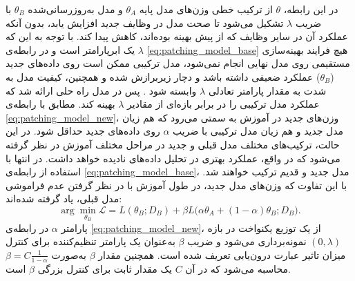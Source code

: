 در این رابطه، $\theta$ از ترکیب خطی وزن‌های مدل پایه $\theta_A$ و مدل به‌روزرسانی‌شده $\theta_B$ با ضریب $\lambda$ تشکیل می‌شود تا صحت مدل در وظایف جدید افزایش یابد، بدون آنکه عملکرد آن در سایر وظایف که از پیش بهینه بوده‌اند، کاهش پیدا کند. با توجه به این که $\lambda$ یک ابرپارامتر  است و در رابطه‌ی \eqref{eq:patching_model_base} هیچ فرایند بهینه‌سازی مستقیمی روی مدل نهایی انجام نمی‌شود، مدل ترکیبی ممکن است روی داده‌های جدید ($\theta_B$) عملکرد ضعیفی داشته باشد و دچار زیر‌برازش شده و همچنین، کیفیت مدل به شدت به مقدار پارامتر تعادلی $\lambda$ وابسته شود \cite{open-vclip}. پس در مدل  راه حلی ارائه شد که عملکرد مدل ترکیبی را در برابر بازه‌ای از مقادیر $\lambda$ بهینه کند. مطابق با رابطه‌ی \eqref{eq:patching_model_new}، وزن‌های جدید در آموزش به سمتی می‌رود که هم زیان مدل جدید و هم زیان مدل ترکیبی با ضریب $\alpha$ روی داده‌های جدید حداقل شود. در این حالت، ترکیب‌های مختلف مدل قبلی و جدید در مراحل مختلف آموزش در نظر گرفته می‌شود که در واقع، عملکرد بهتری در تحلیل داده‌های نادیده خواهد داشت. در انتها با استفاده از رابطه‌ی \eqref{eq:patching_model_base}، مدل جدید و قدیم ترکیب خواهند شد. با این تفاوت که وزن‌های مدل جدید، در طول آموزش با در نظر گرفتن عدم فراموشی مدل قبلی، یاد گرفته شده‌اند:
\begin{equation}\label{eq:patching_model_new}
	\arg \min_{\theta_B} \mathcal{L} =
	L(\theta_B; D_B) + \beta L\big(\alpha \theta_A + (1 - \alpha)\theta_B; D_B\big).
\end{equation}
پارامتر \( \alpha \) در رابطه‌ی \eqref{eq:patching_model_new}، از یک توزیع یکنواخت در بازه \( (0, \lambda) \) نمونه‌برداری می‌شود و ضریب \( \beta \) به‌عنوان یک پارامتر تنظیم‌کننده برای کنترل میزان تاثیر عبارت درون‌یابی تعریف شده است. همچنین مقدار \( \beta \) به‌صورت \( \beta = C \frac{1}{1 - \alpha} \) محاسبه می‌شود که در آن \( C \) یک مقدار ثابت برای کنترل بزرگی \(\beta\) است. 

